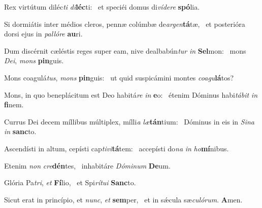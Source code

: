 \item Rex virtútum diléc\textit{ti} \textit{di}\textbf{léc}ti:~\psstar{} et speciéi domus di\textit{vídere} \textbf{spó}lia.

\item Si dormiátis inter médios cleros, pennæ colúmbæ de\textit{argen}\textbf{tá}tæ,~\psstar{} et posterióra dorsi ejus in \textit{pallóre} \textbf{au}ri.

\item Dum discérnit cæléstis reges super eam, nive dealbabún\textit{tur} \textit{in} \textbf{Sel}mon:~\psstar{} mons \textit{Dei}, \textit{mons} \textbf{pin}guis.

\item Mons coagulá\textit{tus}, \textit{mons} \textbf{pin}guis:~\psstar{} ut quid suspicámini montes \textit{coagu}\textbf{lá}tos?

\item Mons, in quo beneplácitum est Deo habitá\textit{re} \textit{in} \textbf{e}o:~\psstar{} étenim Dóminus habi\textit{tábit} \textit{in} \textbf{fi}nem.

\item Currus Dei decem míllibus múltiplex, mílli\textit{a} \textit{læ}\textbf{tán}tium:~\psstar{} Dóminus in eis in \textit{Sina} \textit{in} \textbf{sanc}to.

\item Ascendísti in altum, cepísti cap\textit{tivi}\textbf{tá}tem:~\psstar{} accepísti do\textit{na} \textit{in} \textit{ho}\textbf{mí}nibus.

\item Etenim \textit{non} \textit{cre}\textbf{dén}tes,~\psstar{} inhabitáre \textit{Dóminum} \textbf{De}um.

\item Glória Pa\textit{tri}, \textit{et} \textbf{Fí}lio,~\psstar{} et Spi\textit{rítui} \textbf{Sanc}to.

\item Sicut erat in princípio, et \textit{nunc}, \textit{et} \textbf{sem}per,~\psstar{} et in sǽcula sæ\textit{culórum}. \textbf{A}men.
